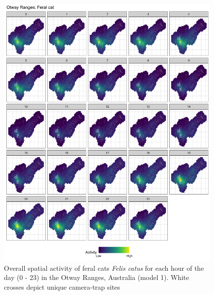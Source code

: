 \documentclass[]{elsarticle} %
\begin{document}
\begin{figure}

{\centering \includegraphics[width=1\linewidth]{../figs/spte_facet_o_cat} 

}

\caption{Overall spatial activity of feral cats \textit{Felis catus} for each hour of the day (0 - 23) in the Otway Ranges, Australia (model 1). White crosses depict unique camera-trap sites}\label{fig:diel-space-o-cat}
\end{figure}
\end{document}

